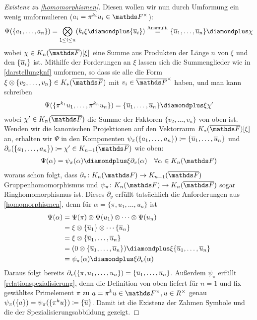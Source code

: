 \documentclass[ngerman,fontsize=11pt, paper=a4, parskip=half, titlepage=true, toc=bib]{scrartcl}
\begin{document}
\begin{proof}[Existenz zu \ref{homomorphismen}]
  Diesen wollen wir nun durch Umformung ein wenig umformulieren
  ($a_i=\pi^{k_i}u_i\in\Fx$):
  \begin{gather*}
    \Psi(\{a_1,\dotsc,a_n\})
    =\bigotimes_{1\leq i\leq n}(k_i\xi\p\{\ov u_i\})
    \overset{\text{Ausmult.}}{=}
    \{\ov u_1,\dotsc,\ov u_n\}\p \chi
  \end{gather*}
  wobei $\chi\in\KnbF[\xi]$ eine Summe aus Produkten der Länge $n$ 
  von $\xi$ und den $\{\overline u_i\}$ ist.
  Mithilfe der Forderungen an $\xi$  lassen sich die Summenglieder 
  wie in \ref{darstellungknf} umformen, so dass sie alle die Form
  $\xi\otimes\{v_2,\dotsc, v_n\}\in\KbF$ mit $v_i\in\bFx$
  haben,
  und man kann schreiben
  \begin{gather*}
    \Psi(\{\pi^{k_1}u_1,\dotsc,\pi^{k_n}u_n\}) 
    = \{\ov u_1,\dotsc,\ov u_n\}\p \xi\chi'
  \end{gather*}
  wobei $\chi'\in\KnbF$ die Summe der Faktoren $\{v_2,\dotsc,v_n\}$
  von oben ist.
  Wenden wir die kanonischen Projektionen auf den Vektorraum 
  $\KbF[\xi]$ an, erhalten wir $\Psi$ in den Komponenten
  $\psi_\pi(\{a_1,\dotsc,a_n\})\coloneqq \{\overline u_1,\dotsc,\overline u_n\}$
  und $\partial_v(\{a_1,\dotsc,a_n\})\coloneqq \chi'\in\K_{n-1}(\bF)$ wie oben:
  \begin{gather*}
    \Psi(\alpha) = \psi_\pi(\alpha)\p \xi\partial_v(\alpha)
    \quad \forall\alpha\in\KnF
  \end{gather*}
  woraus schon folgt, 
  dass $\partial_v\colon\KnF\to\K_{n-1}(\bF)$ Gruppenhomomorphismus 
  und $\psi_\pi\colon\KnF\to\KnbF$ sogar Ringhomomorphismus ist.
  Dieses $\partial_v$ erfüllt tatsächlich die Anforderungen aus 
  \ref{homomorphismen}, denn für $\alpha=\{\pi,u_1,\dotsc, u_n\}$ ist
  \begin{align*}
    \Psi(\alpha)
    &=\Psi(\pi)\otimes\Psi(u_1)\otimes\dotsb\otimes\Psi(u_n)\\
    &=\xi\otimes\{\ov u_1\}\otimes\dotsb\{\ov u_n\}\\
    &=\xi\otimes\{\ov u_1,\dotsc,\ov u_n\}\\
    &=(0\otimes\{\ov u_1,\dotsc,\ov u_n\})
      \p\xi\{\ov u_1,\dotsc,\ov u_n\}\\
    &=\psi_\pi(\alpha) \p \xi\partial_v(\alpha)
  \end{align*}
  Daraus folgt bereits
  $\partial_v(\{\pi,u_1,\dotsc,u_n\})=\{\overline u_1,\dotsc,\overline u_n\}$.  
  Außerdem $\psi_\pi$ erfüllt \ref{relationspezialisierung}, denn 
  die Definition von oben liefert für $n=1$ und fix gewähltes
  Primelement $\pi$ zu $a=\pi^ku\in\Fx, u\in\Rx$ genau
  $\psi_\pi(\{a\})=\psi_\pi(\{\pi^ku\})\coloneqq\{\overline u\}$.
  Damit ist die Existenz der Zahmen Symbole und die der
  Spezialisierungsabbildung gezeigt.
\end{proof}
\end{document}
